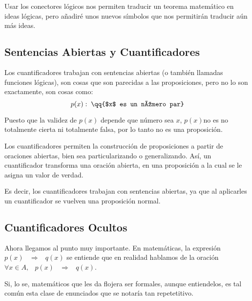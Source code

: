 \documentclass[12pt, fleqn]{report}                             %
\newcommand \Quote {\qq}                                        %
\DeclareMathOperator \Space {\quad}                             %
\DeclareMathOperator \MiniSpace {\;}                            %
\newcommand \lequal {\MiniSpace \Leftrightarrow \MiniSpace}     %
\newcommand \linfire {\MiniSpace \Rightarrow \MiniSpace}        %
\begin{document}
            Usar los conectores lógicos nos permiten traducir un teorema matemático en ideas lógicas, pero
            añadiré unos nuevos símbolos que nos permitirán traducir aún más ideas.


            \subsection{Sentencias Abiertas y Cuantificadores}

                Los cuantificadores trabajan con sentencias abiertas (o también llamadas funciones lógicas),
                son cosas que son parecidas a las proposiciones, pero no lo son exactamente, son cosas como:
                \begin{equation*}
                    p(x): \; \text{\Quote{$x$ es un número par}}  
                \end{equation*}

                Puesto que la validez de $p(x)$ depende que número sea $x$, $p(x)$no es no
                totalmente cierta ni totalmente falsa, por lo tanto no es una proposición.

                Los cuantificadores permiten la construcción de proposiciones a partir de oraciones abiertas,
                bien sea particularizando o generalizando. Así, un cuantificador transforma una oración abierta,
                en una proposición a la cual se le asigna un valor de verdad.

                Es decir, los cuantificadores trabajan con sentencias abiertas, ya que al aplicarles un
                cuantificador se vuelven una proposición normal.

            \subsection{Cuantificadores Ocultos}
                Ahora llegamos al punto muy importante. En matemáticas, la expresión $p(x) \linfire q(x)$
                se entiende que en realidad hablamos de la oración $\forall x \in A, \MiniSpace p(x) \linfire q(x)$.

                Si, lo se, matemáticos que les da flojera ser formales, aunque entiendelos, es tal común esta
                clase de enunciados que se notaría tan repetetitivo.
\end{document}
